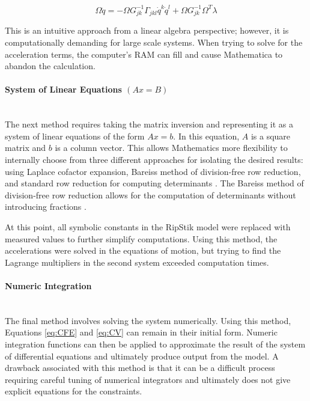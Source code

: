 \begin{equation}
\label{eq:SMI}
\Omega \ddot{q} = -\Omega G_{jk}^{-1}\Gamma_{jkl} \dot{q}^k\dot{q}^l + \Omega G_{jk}^{-1} \Omega ^T \lambda
\end{equation}

This is an intuitive approach from a linear algebra perspective; however, it is computationally demanding for large scale systems. 
When trying to solve for the acceleration terms, the computer's RAM can fill and cause Mathematica to abandon the calculation.

\paragraph{System of Linear Equations $(Ax=B)$}\mbox{}\\
The next method requires taking the matrix inversion and representing it as a system of linear equations of the form $Ax=b$.
In this equation, $A$ is a square matrix and $b$ is a column vector.
This allows Mathematics more flexibility to internally choose from three different approaches for isolating the desired results: using Laplace cofactor expansion, Bareiss method of division-free row reduction, and standard row reduction for computing determinants \cite{linearsolve}.
The Bareiss method of division-free row reduction allows for the computation of determinants without introducing fractions \cite{bareiss}.
\par
At this point, all symbolic constants in the RipStik model were replaced with measured values to further simplify computations.
Using this method, the accelerations were solved in the equations of motion, but trying to find the Lagrange multipliers in the second system exceeded computation times.

\paragraph{Numeric Integration}\mbox{}\\
The final method involves solving the system numerically.
Using this method, Equations \ref{eq:CFE} and \ref{eq:CV} can remain in their initial form.
Numeric integration functions can then be applied to approximate the result of the system of differential equations and ultimately produce output from the model.
A drawback associated with this method is that it can be a difficult process requiring careful tuning of numerical integrators and ultimately does not give explicit equations for the constraints.

